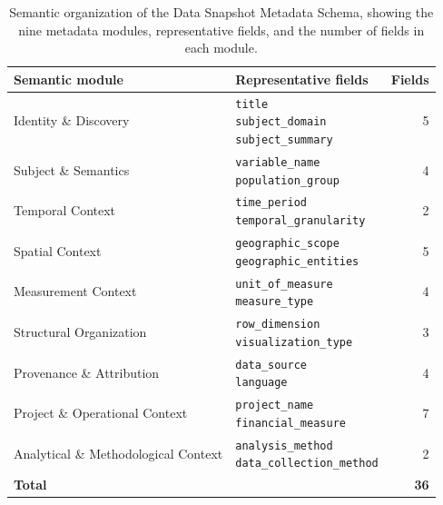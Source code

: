 \documentclass{article}
\begin{document}
\begin{table}[!ht]
    \centering
    \caption{Semantic organization of the Data Snapshot Metadata Schema, showing the nine metadata modules, representative fields, and the number of fields in each module.}
    \label{tab:schema}
    
    \begin{tabular}{llr}    
        \toprule
        \textbf{Semantic module} & \textbf{Representative fields} & \textbf{Fields} \\
        \midrule
        Identity \& Discovery & \makecell[l]{\texttt{title} \\ \texttt{subject\_domain} \\ \texttt{subject\_summary}} & 5 \\
        \midrule
        Subject \& Semantics & \makecell[l]{\texttt{variable\_name} \\ \texttt{population\_group}} & 4 \\
        \midrule
        Temporal Context & \makecell[l]{\texttt{time\_period} \\ \texttt{temporal\_granularity}} & 2 \\
        \midrule
        Spatial Context & \makecell[l]{\texttt{geographic\_scope} \\ \texttt{geographic\_entities}} & 5 \\
        \midrule
        Measurement Context & \makecell[l]{\texttt{unit\_of\_measure} \\ \texttt{measure\_type}} & 4 \\
        \midrule
        Structural Organization & \makecell[l]{\texttt{row\_dimension} \\ \texttt{visualization\_type}} & 3 \\
        \midrule
        Provenance \& Attribution & \makecell[l]{\texttt{data\_source} \\ \texttt{language}} & 4 \\
        \midrule
        Project \& Operational Context & \makecell[l]{\texttt{project\_name} \\ \texttt{financial\_measure}} & 7 \\
        \midrule
        Analytical \& Methodological Context & \makecell[l]{\texttt{analysis\_method} \\ \texttt{data\_collection\_method}} & 2 \\
        \midrule
        \textbf{Total} &  & \textbf{36} \\
        \bottomrule
    \end{tabular}
\end{table}
\end{document}
